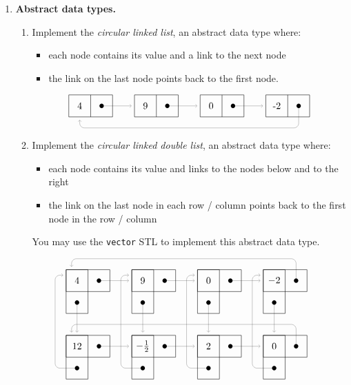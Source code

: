 \documentclass[a4paper,12pt]{article}
\begin{document}
\begin{enumerate}
\item \textbf{Abstract data types.} 
\begin{enumerate}
\item Implement the \textit{circular linked list}, an abstract data type where:
\begin{itemize}
\item each node contains its value and a link to the next node
\item the link on the last node points back to the first node.
\end{itemize}
\vspace{10pt}
\[
\begin{tikzpicture}[scale=.8,link/.style={opacity=.4,->,shorten >=3pt}]
\draw (0,0) rectangle (2,1); \draw (1,0)--(1,1);
\draw (3,0) rectangle (5,1); \draw (4,0)--(4,1);
\draw (6,0) rectangle (8,1); \draw (7,0)--(7,1);
\draw (9,0) rectangle (11,1); \draw (10,0)--(10,1);
\foreach \x\n in {0/4, 1/9, 2/0, 3/-2}{
  \node at (3*\x+.5,.5) {\n};
  \fill[black] (3*\x+1.5,.5) circle (.1);
}
\draw[link] (1.5,.5)--(3,.5);
\draw[link] (4.5,.5)--(6,.5);
\draw[link] (7.5,.5)--(9,.5);
\draw[link,rounded corners=5pt] (10.5,.5)--++(270:1)--++(180:10)--++(90:.5);
\end{tikzpicture}
\]
\item Implement the \textit{circular linked double list}, an abstract data type where:
\begin{itemize}
\item each node contains its value and links to the nodes below and to the right
\item the link on the last node in each row / column points back to the first node in the row / column
\end{itemize}
You may use the \texttt{vector} STL to implement this abstract data type.
\end{enumerate}
\vspace{10pt}
\[
\begin{tikzpicture}[scale=.8,link/.style={opacity=.4,->,shorten >=3pt}]
\foreach \x in {0,1,2,3}{
  \foreach \y in {0,-1}{
    \draw (\x*3,\y*3) rectangle (\x*3+2,\y*3+1);
    \draw (\x*3,\y*3+1) rectangle (\x*3+1,\y*3-1);
  }
}
\foreach \x\y\n in {0/0/4, 1/0/9, 2/0/0, 3/0/-2, 0/-1/12, 1/-1/{-\frac12}, 2/-1/2, 3/-1/0 }{
  \node at (3*\x+.5,\y*3+.5) {$\n$};
  \fill[black] (3*\x+1.5,\y*3+.5) circle (.1);
  \fill[black] (3*\x+.5,\y*3-.5) circle (.1);
}
\foreach \x in {0,1,2}{
  \draw[link] (\x*3+1.5,.5)--(\x*3+3,.5);
  \draw[link] (\x*3+1.5,-2.5)--(\x*3+3,-2.5);
}
\foreach \x in {0,1,2,3}{
  \draw[link] (\x*3+.5,-.5)--(\x*3+.5,-2);
  \draw[link,rounded corners=5pt] (\x*3+.5,-3.5)--++(180:1)--++(90:4.25)--++(0:.5);
}

\draw[link,rounded corners=5pt] (10.5,.5)--++(90:1)--++(180:10.25)--++(270:.5);
\draw[link,rounded corners=5pt] (10.5,-2.5)--++(90:1)--++(180:10.25)--++(270:.5);
\end{tikzpicture}
\]

\end{enumerate}
\end{document}
